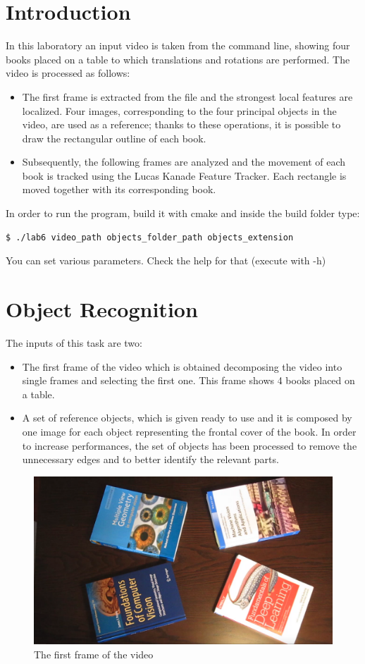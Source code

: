 \documentclass[a4paper,titlepaget]{article}
\begin{document}
\section{Introduction}
In this laboratory an input video is taken from the command line, showing four books placed on a table to which translations and rotations are performed.
The video is processed as follows:
\begin{itemize}
	\item The first frame is extracted from the file and the strongest local features are localized. Four images, corresponding to the four principal objects in the video, are used as a reference; thanks to these operations, it is possible to draw the rectangular outline of each book.
	\item Subsequently, the following frames are analyzed and the movement of each book is tracked using the Lucas Kanade Feature Tracker. Each rectangle is moved together with its corresponding book.	
\end{itemize}
In order to run the program, build it with cmake and inside the build folder type:
\begin{lstlisting}[language=bash]
	$ ./lab6 video_path objects_folder_path objects_extension
\end{lstlisting}
You can set various parameters. Check the help for that (execute with -h)

\newpage

\section{Object Recognition}
The inputs of this task are two:
\begin{itemize}
	\item The first frame of the video which is obtained decomposing the video into single frames and selecting the first one. This frame shows 4 books placed on a table.
	\item A set of reference objects, which is given ready to use and it is composed by one image for each object representing the frontal cover of the book. In order to increase performances, the set of objects has been processed to remove the unnecessary edges and to better identify the relevant parts.
\end{itemize}

\begin{figure}[!htb]
	\centering
	\includegraphics[width=.8\textwidth]{images/first-frame}
	\caption{The first frame of the video}
\end{figure}
\end{document}
